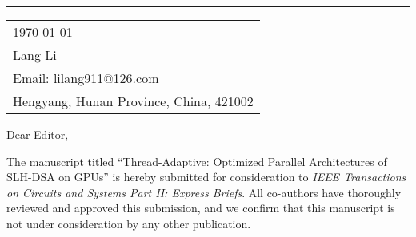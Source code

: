 \documentclass{article}
\begin{document}



\rule{\linewidth}{1pt} %

\bigskip\bigskip %


\hfill
\begin{tabular}{l @{}}
\hfill \today \bigskip\\ %
\hfill Lang Li \\
\hfill Email: lilang911@126.com \\
\hfill Hengyang, Hunan Province, China, 421002 \\ %
\end{tabular}

\bigskip %



\bigskip %

Dear Editor,

\bigskip %


The manuscript titled ``Thread-Adaptive: Optimized Parallel Architectures of SLH-DSA on GPUs'' is hereby submitted for consideration to \textit{IEEE Transactions on Circuits and Systems Part II: Express Briefs}. All co-authors have thoroughly reviewed and approved this submission, and we confirm that this manuscript is not under consideration by any other publication.
\end{document}
